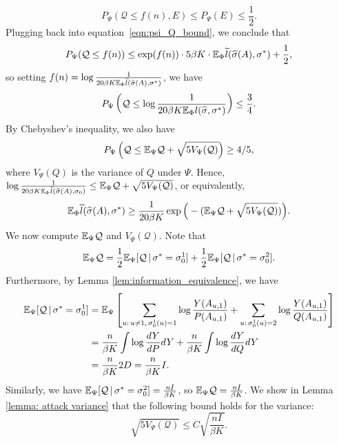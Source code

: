 \documentclass{article}
\begin{document}
\[
P_{\Psi}(\mathcal{Q} \leq f(n), E) 
             \leq P_{\Psi}(E) \leq \frac{1}{2}.
\]
Plugging back into equation~\eqref{eqn:psi_Q_bound}, we conclude that
\[
P_{\Psi}(\mathcal{Q} \leq f(n)) \leq \exp(f(n)) \cdot 5 \beta K \cdot {\mathbb E}_{\Phi} \widetilde{l}(\widehat{\sigma}(A) , \sigma^*) + \frac{1}{2},
\]
so setting $f(n) = \log \frac{1}{20 \beta K  {\mathbb E}_{\Phi} \widetilde{l}(\widehat{\sigma}(A), \sigma^*)}$, we have
\[
P_{\Psi}\left(\mathcal{Q} \leq \log \frac{1}{20 \beta K {\mathbb E}_{\Phi} l(\widehat{\sigma}, \sigma^*)} \right) \leq \frac{3}{4}.
\]
By Chebyshev's inequality, we also have
\[
P_{\Psi}\left( \mathcal{Q} \leq {\mathbb E}_{\Psi} \mathcal{Q} + \sqrt{ 5 V_{\Psi}(\mathcal{Q})} \right) \geq 4/5,
\]
where $V_\Psi(Q)$ is the variance of $Q$ under $\Psi$. Hence, $\log \frac{1}{20 \beta K {\mathbb E}_{\Phi} \widetilde{l}(\widehat{\sigma}(A),\sigma_0)} \leq {\mathbb E}_{\Psi} \mathcal{Q} + \sqrt{ 5 V_{\Psi}(\mathcal{Q})}$, or equivalently,
\[
{\mathbb E}_{\Phi} \widetilde{l}(\widehat{\sigma}(A), \sigma^*) \geq \frac{1}{20 \beta K} \exp\Big( - ({\mathbb E}_{\Psi} \mathcal{Q} + \sqrt{ 5 V_{\Psi}(\mathcal{Q})} ) \Big).
\]
We now compute ${\mathbb E}_{\Psi} \mathcal{Q}$ and $V_{\Psi}(\mathcal{Q})$. Note that
\[
{\mathbb E}_{\Psi} \mathcal{Q} = \frac{1}{2} {\mathbb E}_{\Psi} [ \mathcal{Q} {\,|\,} \sigma^* = \sigma_0^1 ] + 
              \frac{1}{2} {\mathbb E}_{\Psi} [ \mathcal{Q} {\,|\,} \sigma^* = \sigma_0^2 ].
\]
Furthermore, by Lemma \ref{lem:information_equivalence}, we have
\begin{align*}
{\mathbb E}_{\Psi} [\mathcal{Q} {\,|\,} \sigma^* = \sigma_0^1] &= {\mathbb E}_{\Psi} \left[\sum_{u: \, u \neq 1,\, \sigma_0^1(u) = 1} \log \frac{Y(A_{u, 1})}{P(A_{u, 1})} + \sum_{u :\, \sigma_0^1(u) = 2} \log \frac{Y(A_{u, 1})}{Q(A_{u, 1})}\right]  \\
     &= \frac{n}{\beta K}  \int \log \frac{dY}{dP} dY + \frac{n}{\beta K} \int \log \frac{dY}{dQ} dY \\
     &= \frac{n}{\beta K} 2 D = \frac{n}{\beta K} I.
\end{align*}
Similarly, we have ${\mathbb E}_{\Psi}[ \mathcal{Q} {\,|\,} \sigma^* = \sigma_0^2] = \frac{n I}{\beta K}$, so ${\mathbb E}_{\Psi} \mathcal{Q} = \frac{n I}{\beta K}$. We show in Lemma \ref{lemma: attack variance} that the following bound holds for the variance:
$$\sqrt{5 V_{\Psi} (\mathcal{Q})} \leq C \sqrt{ \frac{n I}{\beta K}}.$$
\end{document}
